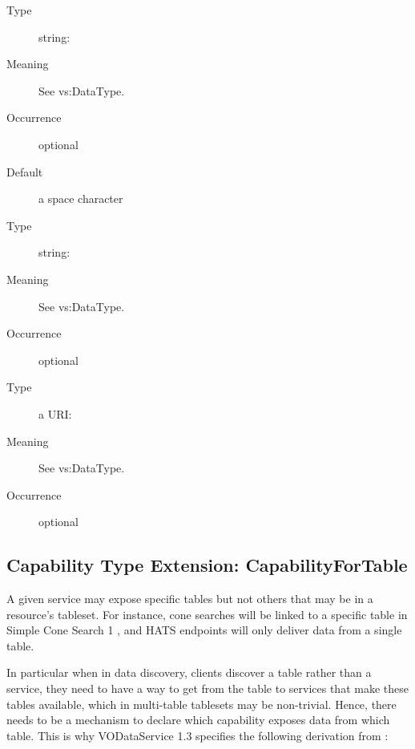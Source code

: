 \documentclass[11pt,a4paper]{ivoa}
\begin{document}
\begin{generated}
\begin{bigdescription}
\begin{description}
\end{description}
\item[delim]
\begin{description}
\item[Type] string: 
\item[Meaning] See vs:DataType.
\item[Occurrence] optional
\item[Default] a space character
\end{description}
\item[extendedType]
\begin{description}
\item[Type] string: 
\item[Meaning] See vs:DataType.
\item[Occurrence] optional
\end{description}
\item[extendedSchema]
\begin{description}
\item[Type] a URI: 
\item[Meaning] See vs:DataType.
\item[Occurrence] optional
\end{description}


\end{bigdescription}\endgroup

\endgroup
\end{generated}




\subsection{Capability Type Extension: CapabilityForTable}

A given service may expose specific tables but not others that may be in
a resource's tableset.  For instance, cone searches will be linked to a
specific table in Simple Cone Search 1 \citep{2008ivoa.specQ0222P}, and
HATS \citep{2025hatsnote} endpoints will only deliver data from a single
table.

In particular when in data discovery, clients discover a table rather
than a service, they need to have a way to get from the table to
services that make these tables available, which in multi-table
tablesets may be non-trivial.  Hence, there needs to be a mechanism to
declare which capability exposes data from which table.  This is why
VODataService 1.3 specifies the following derivation from
:
\end{document}

